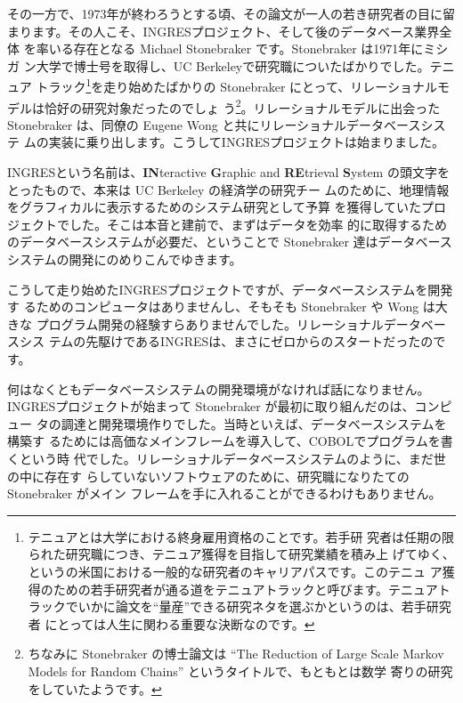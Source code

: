 その一方で、1973年が終わろうとする頃、その論文が一人の若き研究者の目に留
まります。その人こそ、INGRESプロジェクト、そして後のデータベース業界全体
を率いる存在となる Michael Stonebraker です。Stonebraker は1971年にミシガ
ン大学で博士号を取得し、UC Berkeleyで研究職についたばかりでした。テニュア
トラック\footnote{テニュアとは大学における終身雇用資格のことです。若手研
究者は任期の限られた研究職につき、テニュア獲得を目指して研究業績を積み上
げてゆく、というの米国における一般的な研究者のキャリアパスです。このテニュ
ア獲得のための若手研究者が通る道をテニュアトラックと呼びます。テニュアト
ラックでいかに論文を``量産''できる研究ネタを選ぶかというのは、若手研究者
にとっては人生に関わる重要な決断なのです。}を走り始めたばかりの
Stonebraker にとって、リレーショナルモデルは恰好の研究対象だったのでしょ
う\footnote{ちなみに Stonebraker の博士論文は ``The Reduction of Large
Scale Markov Models for Random Chains'' というタイトルで、もともとは数学
寄りの研究をしていたようです。 }。リレーショナルモデルに出会った
Stonebraker は、同僚の Eugene Wong と共にリレーショナルデータベースシステ
ムの実装に乗り出します。こうしてINGRESプロジェクトは始まりました。




INGRESという名前は、{\bf IN}teractive {\bf G}raphic and {\bf RE}trieval
{\bf S}ystem の頭文字をとったもので、本来は UC Berkeley の経済学の研究チー
ムのために、地理情報をグラフィカルに表示するためのシステム研究として予算
を獲得していたプロジェクトでした。そこは本音と建前で、まずはデータを効率
的に取得するためのデータベースシステムが必要だ、ということで Stonebraker
達はデータベースシステムの開発にのめりこんでゆきます。


こうして走り始めたINGRESプロジェクトですが、データベースシステムを開発す
るためのコンピュータはありませんし、そもそも Stonebraker や Wong は大きな
プログラム開発の経験すらありませんでした。リレーショナルデータベースシス
テムの先駆けであるINGRESは、まさにゼロからのスタートだったのです。


何はなくともデータベースシステムの開発環境がなければ話になりません。
INGRESプロジェクトが始まって Stonebraker が最初に取り組んだのは、コンピュー
タの調達と開発環境作りでした。当時といえば、データベースシステムを構築す
るためには高価なメインフレームを導入して、COBOLでプログラムを書くという時
代でした。リレーショナルデータベースシステムのように、まだ世の中に存在す
らしていないソフトウェアのために、研究職になりたての Stonebraker がメイン
フレームを手に入れることができるわけもありません。


